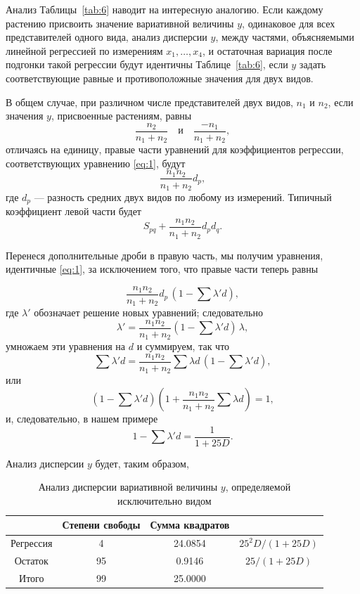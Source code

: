 \documentclass[12pt]{article}
\begin{document}
Анализ Таблицы~\ref{tab:6} наводит на интересную аналогию. Если каждому растению присвоить значение вариативной величины $y$, одинаковое для всех представителей одного вида, анализ дисперсии $y$, между частями, объясняемыми линейной регрессией по измерениям
$x_{1}, \ldots, x_{4}$, и остаточная вариация после подгонки такой регрессии будут идентичны Таблице~\ref{tab:6}, если $y$ задать соответствующие равные и противоположные значения для двух видов.

В общем случае, при различном числе представителей двух видов, $n_{1}$ и $n_{2}$, если значения $y$, присвоенные растениям, равны
\[
\frac{n_{2}}{n_{1}+n_{2}} \quad \text{и} \quad \frac{- n_{1}}{n_{1}+n_{2}},
\]
отличаясь на единицу, правые части уравнений для коэффициентов регрессии, соответствующих уравнению \eqref{eq:1}, будут
\[
\frac{n_{1}n_{2}}{n_{1}+n_{2}} d_{p},
\]
где $d_{p}$ — разность средних двух видов по любому из измерений.  
Типичный коэффициент левой части будет
\[
S_{pq} + \frac{n_{1}n_{2}}{n_{1}+n_{2}} d_{p} d_{q}.
\]

Перенеся дополнительные дроби в правую часть, мы получим уравнения, идентичные \eqref{eq:1}, за исключением того, что правые части теперь равны

\[
\frac{n_{1}n_{2}}{n_{1}+n_{2}} d_{p} \, (1 - \sum \lambda' d),
\]
где $\lambda'$ обозначает решение новых уравнений; следовательно
\[
\lambda' = \frac{n_{1}n_{2}}{n_{1}+n_{2}} (1 - \sum \lambda' d) \, \lambda,
\]
умножаем эти уравнения на $d$ и суммируем, так что
\[
\sum \lambda' d = \frac{n_{1}n_{2}}{n_{1}+n_{2}} \sum \lambda d \, (1 - \sum \lambda' d),
\]
или
\[
(1 - \sum \lambda' d) \left( 1 + \frac{n_{1}n_{2}}{n_{1}+n_{2}} \sum \lambda d \right) = 1,
\]
и, следовательно, в нашем примере
\[
1 - \sum \lambda' d = \frac{1}{1+25D}.
\]

Анализ дисперсии $y$ будет, таким образом,
\begin{table}[H]
\centering
\footnotesize
\caption{Анализ дисперсии вариативной величины $y$, определяемой исключительно видом}
\label{tab:7}
\begin{tabular}{|c|c|c|c|}
\hline
 & Степени свободы & Сумма квадратов & \\
\hline
Регрессия & 4  & 24.0854 &  $ 25^2D/(1+25D)$ \\
Остаток   & 95 & 0.9146  &  $ 25/(1+25D)$ \\
\hline
Итого     & 99 & 25.0000 & \\
\hline
\end{tabular}
\end{table}
\end{document}
